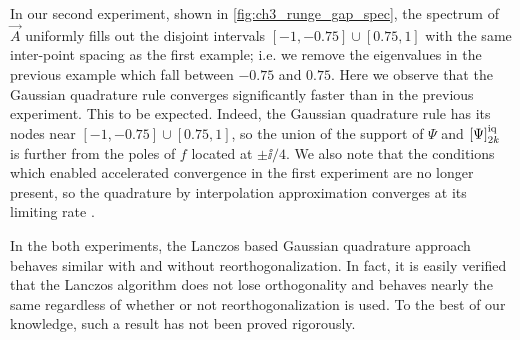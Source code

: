 In our second experiment, shown in \cref{fig:ch3_runge_gap_spec}, the spectrum of \( \vec{A} \) uniformly fills out the disjoint intervals \( [-1,-0.75] \cup [0.75,1] \) with the same inter-point spacing as the first example; i.e. we remove the eigenvalues in the previous example which fall between \( -0.75 \) and \( 0.75 \).
Here we observe that the Gaussian quadrature rule converges significantly faster than in the previous experiment.
This to be expected. 
Indeed, the Gaussian quadrature rule has its nodes near \( [-1,-0.75]\cup[0.75,1] \), so the union of the support of \( \Psi \) and \( \qq[i]{\Psi}{2k} \) is further from the poles of \( f \) located at \( \pm \ii /4 \).
We also note that the conditions which enabled accelerated convergence in the first experiment are no longer present, so the quadrature by interpolation approximation converges at its limiting rate \cite{trefethen_08}. 


In the both experiments, the Lanczos based Gaussian quadrature approach behaves similar with and without reorthogonalization.
In fact, it is easily verified that the Lanczos algorithm does not lose orthogonality and behaves nearly the same regardless of whether or not reorthogonalization is used.
To the best of our knowledge, such a result has not been proved rigorously.


